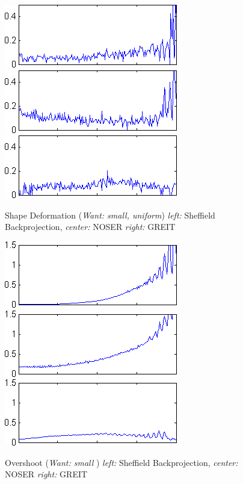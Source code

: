 \documentclass[12pt]{iopart}
\begin{document}
\begin{figure}[bhtp, bb=0 0 280 110]
\begin{center}
  \includegraphics[width= 0.3 \textwidth, bb=0 0 280 110]
{../../tutorial/GREIT-evaluation/simulation_test_imgs/simulation_test04_15.png}
  \includegraphics[width= 0.3 \textwidth, bb=0 0 280 110]
{../../tutorial/GREIT-evaluation/simulation_test_imgs/simulation_test04_25.png}
  \includegraphics[width= 0.3 \textwidth, bb=0 0 280 110]
{../../tutorial/GREIT-evaluation/simulation_test_imgs/simulation_test04_45.png}
\caption{ \label{fig:rimage}
Shape Deformation ({\em Want: small, uniform})
{\em left:} Sheffield Backprojection,
{\em center:} NOSER
{\em right:} GREIT
}
\end{center}
\end{figure}

\begin{figure}[bhtp, bb=0 0 280 110]
\begin{center}
  \includegraphics[width= 0.3 \textwidth, bb=0 0 280 110]
{../../tutorial/GREIT-evaluation/simulation_test_imgs/simulation_test04_16.png}
  \includegraphics[width= 0.3 \textwidth, bb=0 0 280 110]
{../../tutorial/GREIT-evaluation/simulation_test_imgs/simulation_test04_26.png}
  \includegraphics[width= 0.3 \textwidth, bb=0 0 280 110]
{../../tutorial/GREIT-evaluation/simulation_test_imgs/simulation_test04_46.png}
\caption{ \label{fig:rimage}
Overshoot ({\em Want: small })
{\em left:} Sheffield Backprojection,
{\em center:} NOSER
{\em right:} GREIT
}
\end{center}
\end{figure}
\end{document}

